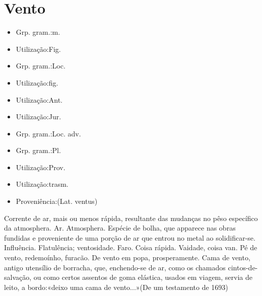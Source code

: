 \documentclass{article}
\begin{document}
\section{Vento}
\begin{itemize}
\item {Grp. gram.:m.}
\end{itemize}
\begin{itemize}
\item {Utilização:Fig.}
\end{itemize}
\begin{itemize}
\item {Grp. gram.:Loc.}
\end{itemize}
\begin{itemize}
\item {Utilização:fig.}
\end{itemize}
\begin{itemize}
\item {Utilização:Ant.}
\end{itemize}
\begin{itemize}
\item {Utilização:Jur.}
\end{itemize}
\begin{itemize}
\item {Grp. gram.:Loc. adv.}
\end{itemize}
\begin{itemize}
\item {Grp. gram.:Pl.}
\end{itemize}
\begin{itemize}
\item {Utilização:Prov.}
\end{itemize}
\begin{itemize}
\item {Utilização:trasm.}
\end{itemize}
\begin{itemize}
\item {Proveniência:(Lat. \textunderscore ventus\textunderscore )}
\end{itemize}
Corrente de ar, mais ou menos rápida, resultante das mudanças no pêso específico da atmosphera.
Ar.
Atmosphera.
Espécie de bolha, que apparece nas obras fundidas e proveniente de uma porção de ar que entrou no metal ao solidificar-se.
Influência.
Flatulência; ventosidade.
Faro.
Coisa rápida.
Vaidade, coisa van.
\textunderscore Pé de vento\textunderscore , redemoínho, furacão.
\textunderscore De vento em popa\textunderscore , prosperamente.
\textunderscore Cama de vento\textunderscore , antigo utensílio de borracha, que, enchendo-se de ar, como os chamados \textunderscore cintos-de-salvação\textunderscore , ou como certos assentos de goma elástica, usados em viagem, servia de leito, a bordo:«\textunderscore deixo uma cama de vento...\textunderscore »(De um testamento de 1693)
\end{document}

